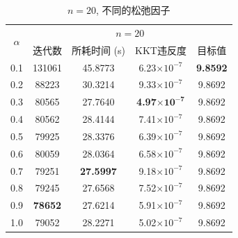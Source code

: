 \documentclass[UTF8,10.5pt,a4paper]{ctexart}
\theoremstyle{definition}
\theoremstyle{definition}
\begin{document}
\begin{table}[htbp]
	\renewcommand{\captionfont}{\small}
    \centering
    \caption{$n=20$, 不同的松弛因子}
    \label{n20alpha}
    \vskip 4mm
    \begin{tabular}{c|c|c|c|c}
        \hline
        \multirow{2}{*}{$\alpha$} & \multicolumn{4}{c}{$n=20$}\\\cline{2-5}
          & 迭代数 & 所耗时间 (s) & KKT违反度 & 目标值\\\hline
        0.1 & 131061 & 45.8773 & 6.23$\times10^{-7}$ & \textbf{9.8592} \\\hline
        0.2 & 88223 & 30.3214 & 9.33$\times10^{-7}$ & 9.8692 \\\hline
        0.3 & 80565 & 27.7640 & \textbf{4.97$\mathbf{\times10^{-7}}$} & 9.8692 \\\hline
        0.4 & 80562 & 28.4144 & 7.41$\times10^{-7}$ & 9.8692 \\\hline
        0.5 & 79925 & 28.3376 & 6.39$\times10^{-7}$ & 9.8692 \\\hline
        0.6 & 80059 & 28.0364 & 6.58$\times10^{-7}$ & 9.8692 \\\hline
        0.7 & 79251 & \textbf{27.5997} & 9.18$\times10^{-7}$ & 9.8692 \\\hline
        0.8 & 79245 & 27.6568 & 7.52$\times10^{-7}$ & 9.8692 \\\hline
        0.9 & \textbf{78652} & 27.6214 & 5.91$\times10^{-7}$ & 9.8692 \\\hline
        1.0 & 79052 & 28.2271 & 5.02$\times10^{-7}$ & 9.8692 \\\hline
    \end{tabular}
\end{table}
\end{document}
